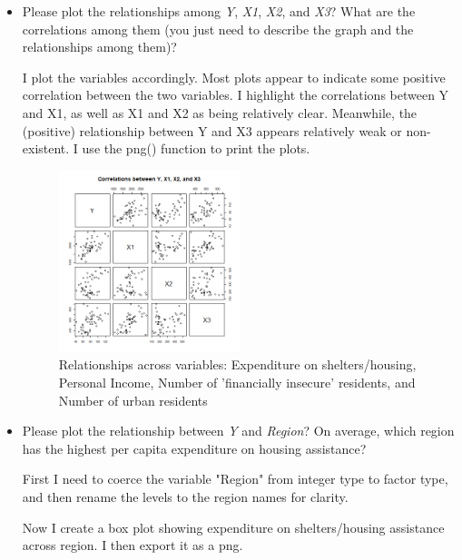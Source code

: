 \documentclass[12pt,letterpaper]{article}
\begin{document}
\begin{itemize}
\item
Please plot the relationships among \emph{Y}, \emph{X1}, \emph{X2}, and \emph{X3}? What are the correlations among them (you just need to describe the graph and the relationships among them)?

\noindent I plot the variables accordingly. Most plots appear to indicate some positive correlation between the two variables. I highlight the correlations between Y and X1, as well as X1 and X2 as being relatively clear. Meanwhile, the (positive) relationship between Y and X3 appears relatively weak or non-existent. I use the png() function to print the plots.


 
 \begin{figure}[H]
 	\centering
 	\includegraphics[width=0.5\textwidth]{scatter_y_x1_x2_x3.png}
 	\caption{Relationships across variables: Expenditure on shelters/housing, Personal Income, Number of 'financially insecure' residents, and Number of urban residents}
 \end{figure}

\vspace{.5cm}

\item Please plot the relationship between \emph{Y} and \emph{Region}? On average, which region has the highest per capita expenditure on housing assistance?
\vspace{.5cm}

\noindent First I need to coerce the variable "Region" from integer type to factor type, and then rename the levels to the region names for clarity.



\noindent Now I create a box plot showing expenditure on shelters/housing assistance across region. I then export it as a png.


\end{itemize}
\end{document}
